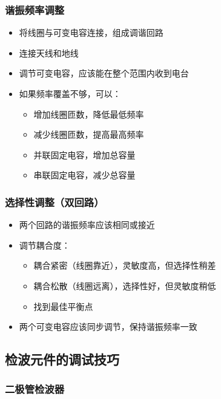 \documentclass[12pt,UTF8]{ctexbook}
\begin{document}
\subsubsection{谐振频率调整}

\begin{itemize}[leftmargin=3.5em]
    \item 将线圈与可变电容连接，组成调谐回路
    \item 连接天线和地线
    \item 调节可变电容，应该能在整个范围内收到电台
    \item 如果频率覆盖不够，可以：
        \begin{itemize}[leftmargin=3.5em]
            \item 增加线圈匝数，降低最低频率
            \item 减少线圈匝数，提高最高频率
            \item 并联固定电容，增加总容量
            \item 串联固定电容，减少总容量
        \end{itemize}
\end{itemize}

\subsubsection{选择性调整（双回路）}

\begin{itemize}[leftmargin=3.5em]
    \item 两个回路的谐振频率应该相同或接近
    \item 调节耦合度：
        \begin{itemize}[leftmargin=3.5em]
            \item 耦合紧密（线圈靠近），灵敏度高，但选择性稍差
            \item 耦合松散（线圈远离），选择性好，但灵敏度稍低
            \item 找到最佳平衡点
        \end{itemize}
    \item 两个可变电容应该同步调节，保持谐振频率一致
\end{itemize}

\subsection{检波元件的调试技巧}

\subsubsection{二极管检波器}
\end{document}
